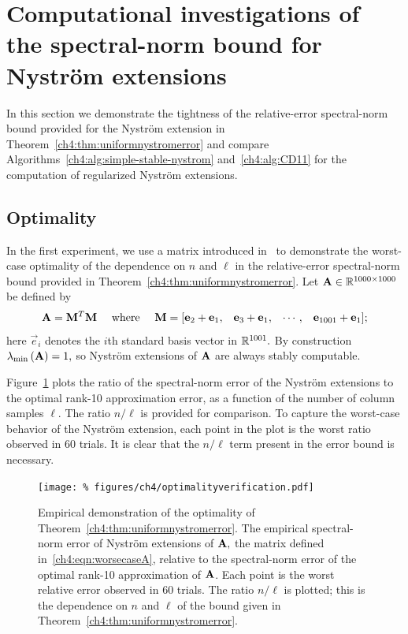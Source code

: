  

 
\section{Computational investigations of the spectral-norm bound for Nystr\"om extensions}
\label{ch4:sec:experiments}

In this section we demonstrate the tightness of the relative-error 
spectral-norm bound provided for the Nystr\"om extension in 
Theorem~\ref{ch4:thm:uniformnystromerror} and
compare Algorithms~\ref{ch4:alg:simple-stable-nystrom} and~\ref{ch4:alg:CD11} for 
the computation of regularized Nystr\"om extensions.

\subsection{Optimality}
In the first experiment, we use a matrix introduced in~\cite{BDM11a} to demonstrate 
the worst-case optimality of the dependence on $n$ and $\ell$ in the relative-error
spectral-norm bound provided in Theorem~\ref{ch4:thm:uniformnystromerror}.
Let $\mathbf{A} \in \mathbb{R}^{1000 \times 1000}$ be defined by
\begin{equation}
\mathbf{A} = \mathbf{M}^T \mathbf{M} \quad \text{ where } \quad 
 \mathbf{M} = [\begin{matrix} \mathbf{e}_2 + \mathbf{e}_1, & \mathbf{e}_3 + \mathbf{e}_1, &
\cdots, & \mathbf{e}_{1001} + \mathbf{e}_1 \end{matrix}];
 \label{ch4:eqn:worsecaseA}
\end{equation}
here $\vec{e}_i$ denotes the $i$th standard basis vector in $\mathbb{R}^{1001}.$ By
construction $\lambda_{\mathrm{min}}\left(\mathbf{A}\right) = 1,$ so Nystr\"om extensions of $\mathbf{A}$
are always stably computable.

Figure~\ref{ch4:fig:optimality} plots the ratio of the spectral-norm error of the Nystr\"om extensions 
to the optimal rank-10 approximation error, as a function of the number of column samples $\ell$. The ratio $n/\ell$ is provided for
comparison. To capture the worst-case behavior of the 
Nystr\"om extension, each point in the plot is the worst ratio observed in 60 trials.
 It is clear that the $n/\ell$ term present in the error bound is
necessary.

\begin{figure}[tb]
 \centering
 \texttt{[image: \%
figures/ch4/optimalityverification.pdf]}
 \caption[Empirical demonstration of the optimality of Theorem~\ref{ch4:thm:uniformnystromerror}.]{
 {\sc Empirical demonstration of the optimality of Theorem~\ref{ch4:thm:uniformnystromerror}. } The empirical spectral-norm error of Nystr\"om extensions of
$\mathbf{A},$ the matrix defined in~\eqref{ch4:eqn:worsecaseA}, relative to the
spectral-norm error of the optimal rank-10 approximation of $\mathbf{A}$. Each
point is the worst relative error observed in 60 trials. The ratio $n/\ell$ is
plotted; this is the dependence on $n$ and $\ell$ of the bound given in
Theorem~\ref{ch4:thm:uniformnystromerror}.}
 \label{ch4:fig:optimality}
\end{figure}


